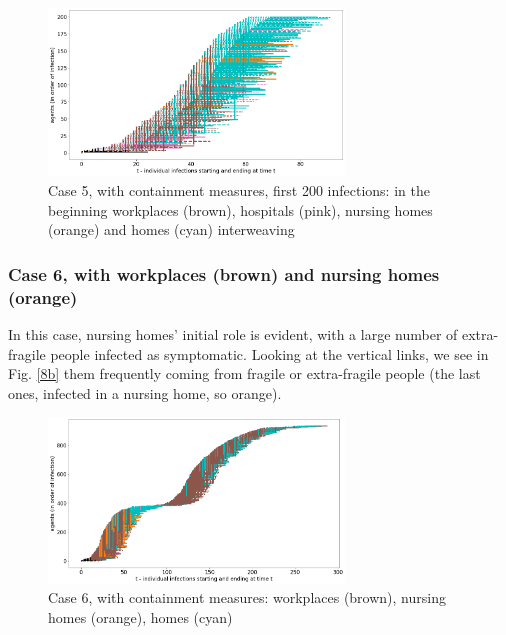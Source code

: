 \documentclass[graybox]{svmult}
\begin{document}
\begin{figure}[t]
\begin{center}
\includegraphics[width=0.7\textwidth]{with7b.png}%
\caption{Case 5, with containment measures, first 200 infections: in the beginning workplaces (brown), hospitals (pink), nursing homes (orange) and homes (cyan) interweaving}
\label{7b}
\end{center}
\end{figure}


\subsubsection{Case 6, with workplaces (brown) and nursing homes (orange)}
\label{c6}


In this case, nursing homes' initial role is evident, with a large number of extra-fragile people infected as symptomatic. Looking at the vertical links, we see in Fig. \ref{8b} them frequently coming from fragile or extra-fragile people (the last ones, infected in a nursing home, so orange).

\begin{figure}[t]
\begin{center}
\includegraphics[width=0.7\textwidth]{with8a.png}%
\caption{Case 6, with containment measures: workplaces (brown), nursing homes (orange), homes (cyan)}
\label{8a}
\end{center}
\end{figure}
\end{document}
